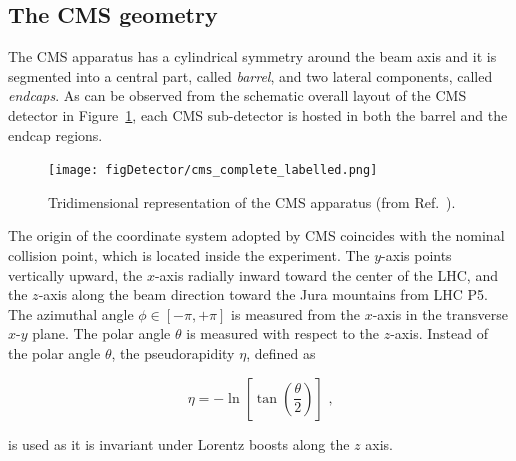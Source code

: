 \subsection{The CMS geometry}
\label{subsec:CMSgeometry}

The CMS apparatus has a cylindrical symmetry around the beam axis and it is
segmented into a central part, called \emph{barrel}, and two lateral components, called 
\emph{endcaps}. As can be observed from the schematic overall layout of the CMS detector
in Figure~\ref{fig:CMSview}, each CMS sub-detector is hosted in both the barrel and the endcap regions.

\begin{figure}[hbt]
  \begin{center}
    \texttt{[image: figDetector/cms\_complete\_labelled.png]}
    \caption{Tridimensional representation of the CMS apparatus (from Ref.~\cite{Chatrchyan:2008aa}).} 
    \label{fig:CMSview}
  \end{center}
\end{figure}

The origin of the coordinate system adopted by CMS coincides with the nominal collision point,
which is located inside the experiment. The $y$-axis points vertically upward,
the $x$-axis radially inward toward the center of the LHC, and the $z$-axis
along the beam direction toward the Jura mountains from LHC P5. 
The azimuthal angle $\phi\in[-\pi,+\pi]$ is measured from the $x$-axis 
in the transverse $x$-$y$ plane. The polar angle $\theta$ is measured with respect to the $z$-axis. 
Instead of the polar angle $\theta$, the pseudorapidity $\eta$, defined as

\begin{equation}
\eta=-\ln\left [\tan\left(\frac{\theta}{2}\right)\right]\mbox{ ,}
\end{equation}

is used as it is invariant under Lorentz boosts along the $z$ axis.




